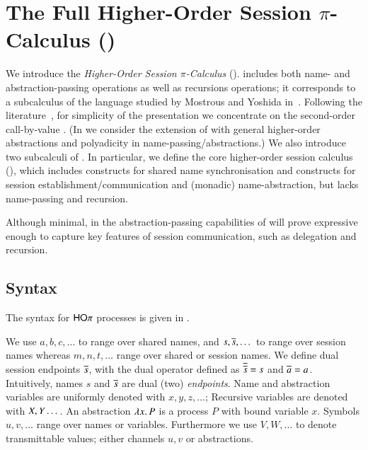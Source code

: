 
\section{The Full Higher-Order Session $\pi$-Calculus (\HOp)}
\label{sec:calculus}

We introduce the 
\emph{Higher-Order Session $\pi$-Calculus} (\HOp).
\HOp includes both name- and abstraction-passing operations
as well as recursions operations; it corresponds to a subcalculus 
of the language
studied by Mostrous and Yoshida
in~\cite{tlca07}. 
Following the literature~\cite{DBLP:journals/lmcs/JeffreyR05},
for simplicity of the presentation
we concentrate on the second-order call-by-value \HOp.  
(In  we consider the extension of 
\HOp with general higher-order abstractions 
and polyadicity in name-passing/abstractions.)
We also introduce two subcalculi of \HOp.
In particular, we define the 
core higher-order session
calculus (\HO), which 
includes constructs for shared name synchronisation and 
constructs for session establish\-ment/communication and 
(monadic) name-abstraction, but lacks name-passing and recursion.

Although minimal, in 
the abstraction-passing capabilities of \HOp will prove 
expressive enough to capture key features of session communication, 
such as delegation and recursion.

\subsection{Syntax} 

The syntax for $\mathsf{HO}\pi$ processes is given in .

We use $a,b,c, \dots$ to range over shared names, and
$s, \overline{s}, \dots$ to range over session names
whereas $m, n, t, \dots$ range over shared or session names.
We define dual session endpoints $\overline{s}$,
with the dual operator defined as
$\overline{\overline{s}} = s$ and $\overline{a} = a$.
Intuitively, names $s$ and $\overline{s}$ are dual (two) \emph{endpoints}.
Name and abstraction variables are uniformly denoted with $x, y, z, \dots$;
Recursive variables are denoted with $X, Y \dots$.
An abstraction $\lambda x.\,P$ is a process $P$ with bound variable $x$.
Symbols $u, v, \dots$ range over names or variables. Furthermore
we use $V, W, \dots$ to denote transmittable values; either channels $u, v$ or
abstractions.

